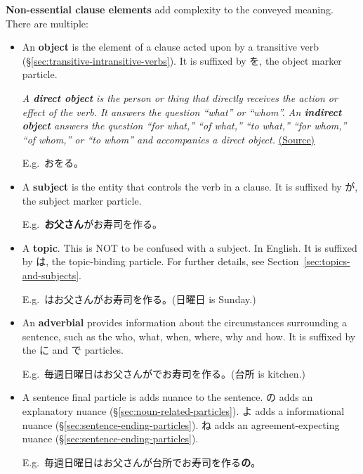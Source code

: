 \documentclass[../nihongo-gakushuu-kyouzai.tex]{subfiles}
\begin{document}
\textbf{Non-essential clause elements} add complexity to the conveyed meaning. There are multiple:
\begin{itemize}
    \item An \textbf{object} is the element of a clause acted upon by a transitive verb (\S\ref{sec:transitive-intransitive-verbs}). It is suffixed by を, the object marker particle.

    \emph{A \textbf{direct object} is the person or thing that directly receives the action or effect of the verb. It answers the question ``what'' or ``whom''.  An \textbf{indirect object} answers the question ``for what,'' ``of what,'' ``to what,'' ``for whom,'' ``of whom,'' or ``to whom'' and accompanies a direct object.} \href{https://www.britannica.com/dictionary/eb/qa/Direct-and-Indirect-Objects}{(Source)}

    E.g.\ お\textbf{}をる。
    \item A \textbf{subject} is the entity that controls the verb in a clause. It is suffixed by が, the subject marker particle.

    E.g.\ \textbf{お父さん}がお寿司を作る。
    \item A \textbf{topic}. This is NOT to be confused with a subject. In English. It is suffixed by は, the topic-binding particle. For further details, see Section~\ref{sec:topics-and-subjects}.

    E.g.\ \textbf{}はお父さんがお寿司を作る。(日曜日 is Sunday.)
    \item An \textbf{adverbial} provides information about the circumstances surrounding a sentence, such as the who, what, when, where, why and how. It is suffixed by the に and で particles.

    E.g.\ 毎週日曜日はお父さんが\textbf{}でお寿司を作る。(台所 is kitchen.)

    \item A sentence final particle is adds nuance to the sentence. の adds an explanatory nuance (\S\ref{sec:noun-related-particles}). よ adds a informational nuance (\S\ref{sec:sentence-ending-particles}). ね adds an agreement-expecting nuance (\S\ref{sec:sentence-ending-particles}).

    E.g.\ 毎週日曜日はお父さんが台所でお寿司を作る\textbf{の}。
\end{itemize}
\end{document}
